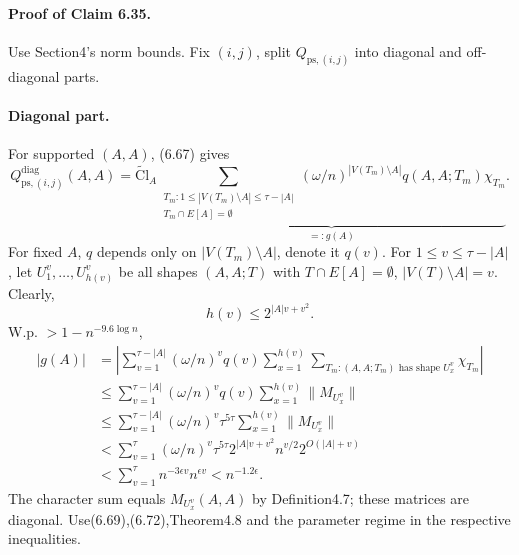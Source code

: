 \paragraph{Proof of Claim 6.35.} Use Section4's norm bounds. Fix $(i,j)$, split $Q_{\mathrm{ps},(i,j)}$ into diagonal and off-diagonal parts.
\paragraph{Diagonal part.} For supported $(A,A)$, (6.67) gives
\[Q_{\mathrm{ps},(i,j)}^{\mathrm{diag}}(A,A)=\widetilde{\mathrm{Cl}}_A\underbrace{\sum_{\substack{T_m:1\le|V(T_m)\setminus A|\le\tau-|A|\\T_m\cap E[A]=\emptyset}}(\omega/n)^{|V(T_m)\setminus A|}q(A,A;T_m)\chi_{T_m}}_{=:g(A)}.\]
For fixed $A$, $q$ depends only on $|V(T_m)\setminus A|$, denote it $q(v)$. For $1\le v\le\tau-|A|$, let $U_1^v,\ldots,U_{h(v)}^v$ be all shapes $(A,A;T)$ with $T\cap E[A]=\emptyset$, $|V(T)\setminus A|=v$. Clearly,
\[h(v)\le2^{|A|v+v^2}.\tag{6.72}\]
W.p. $>1-n^{-9.6\log n}$,
\begin{align*}|g(A)|&=\left|\sum_{v=1}^{\tau-|A|}(\omega/n)^vq(v)\sum_{x=1}^{h(v)}\sum_{T_m:(A,A;T_m)\text{ has shape }U_x^v}\chi_{T_m}\right|\\&\le\sum_{v=1}^{\tau-|A|}(\omega/n)^vq(v)\sum_{x=1}^{h(v)}\|M_{U_x^v}\|\\&\le\sum_{v=1}^{\tau-|A|}(\omega/n)^v\tau^{5\tau}\sum_{x=1}^{h(v)}\|M_{U_x^v}\|\\&<\sum_{v=1}^{\tau}(\omega/n)^v\tau^{5\tau}2^{|A|v+v^2}n^{v/2}2^{O(|A|+v)}\\&<\sum_{v=1}^{\tau}n^{-3\epsilon v}n^{\epsilon v}<n^{-1.2\epsilon}.\end{align*}
The character sum equals $M_{U_x^v}(A,A)$ by Definition4.7; these matrices are diagonal. Use(6.69),(6.72),Theorem4.8 and the parameter regime in the respective inequalities.
